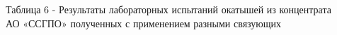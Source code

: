 Таблица 6 - Результаты лабораторных испытаний окатышей из концентрата\\
АО «ССГПО» полученных с применением разными связующих



